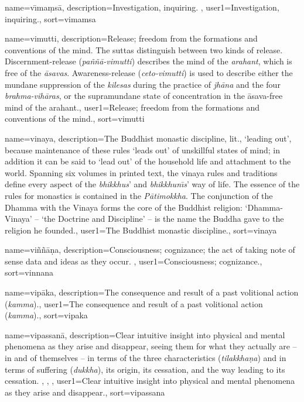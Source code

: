 {
name=v\={\i}ma\d{m}s\=a,
description={Investigation, inquiring. \protect \seepre %
\protect {}%
\protect \seepost %
},
user1={Investigation, inquiring.},
sort={vimamsa}
}

{
name={vimutti},
description={Release; freedom from the formations and conventions of the mind. The suttas distinguish between two kinds of release. Dis\-cern\-ment-release (\textit{pa\~n\~n\=a-vimutti}) describes the mind of the \textit{arahant}, which is free of the \textit{\=asavas}. Awareness-release (\textit{ceto-vimutti}) is used to describe either the mundane suppression of the \textit{kilesas} during the practice of \textit{jh\=ana} and the four \textit{brahma-vih\=aras}, or the supramundane state of concentration in the \=asava-free mind of the arahant.},
user1={Release; freedom from the formations and conventions of the mind.},
sort={vimutti}
}

{
name={vinaya},
description={The Buddhist monastic discipline, lit., `leading out', because maintenance of these rules `leads out' of unskillful states of mind; in addition it can be said to `lead out' of the household life and attachment to the world. Spanning six volumes in printed text, the vinaya rules and traditions define every aspect of the \textit{bhikkhus}' and \textit{bhikkhun\={\i}s}' way of life. The essence of the rules for monastics is contained in the \textit{P\=atimokkha}. The conjunction of the Dhamma with the Vinaya forms the core of the Buddhist religion: `Dhamma-Vinaya' -- `the Doctrine and Discipline' -- is the name the Buddha gave to the religion he founded.},
user1={The Buddhist monastic discipline.},
sort={vinaya}
}

{
name={vi\~n\~n\=a\d{n}a},
description={Consciousness; cognizance; the act of taking note of sense data and ideas as they occur. \protect \seepre %
\protect {}%
\protect \seepost %
},
user1={Consciousness; cognizance.},
sort={vinnana}
}

{
name={vip\=aka},
description={The consequence and result of a past volitional action (\textit{kamma}).},
user1={The consequence and result of a past volitional action (\textit{kamma}).},
sort={vipaka}
}

{
name={vipassan\=a},
description={Clear intuitive insight into physical and mental phenomena as they arise and disappear, seeing them for what they actually are -- in and of themselves -- in terms of the three characteristics (\textit{tilakkha\d{n}a}) and in terms of suffering (\textit{dukkha}), its origin, its cessation, and the way leading to its cessation. \protect \seepre %
\protect {}, \protect {}, \protect {}%
\protect \seepost %
},
user1={Clear intuitive insight into physical and mental phenomena as they arise and disappear.},
sort={vipassana}
}

